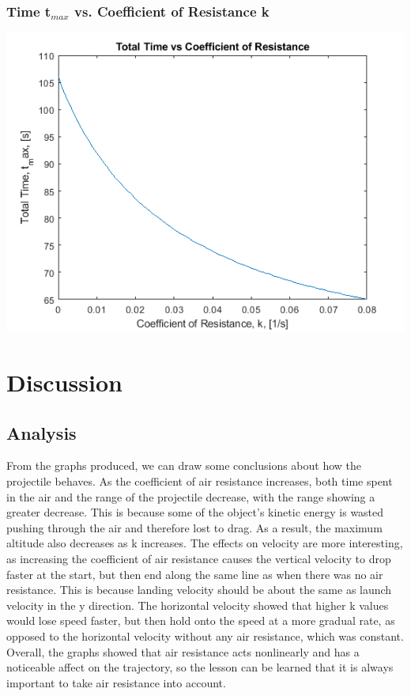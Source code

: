 \documentclass[oneside]{article}
\begin{document}
\subsubsection{Time t$_{max}$ vs. Coefficient of Resistance k}
\includegraphics [width=\linewidth*4/5]{graph_t-k.png}


\newpage
\section{Discussion}
\subsection{Analysis}
From the graphs produced, we can draw some conclusions about how the projectile behaves. As the coefficient of air resistance increases, both time spent in the air and the range of the projectile decrease, with the range showing a greater decrease. This is because some of the object's kinetic energy is wasted pushing through the air and therefore lost to drag. As a result, the maximum altitude also decreases as k increases. The effects on velocity are more interesting, as increasing the coefficient of air resistance causes the vertical velocity to drop faster at the start, but then end along the same line as when there was no air resistance. This is because landing velocity should be about the same as launch velocity in the y direction. The horizontal velocity showed that higher k values would lose speed faster, but then hold onto the speed at a more gradual rate, as opposed to the horizontal velocity without any air resistance, which was constant. Overall, the graphs showed that air resistance acts nonlinearly and has a noticeable affect on the trajectory, so the lesson can be learned that it is always important to take air resistance into account.
\end{document}
